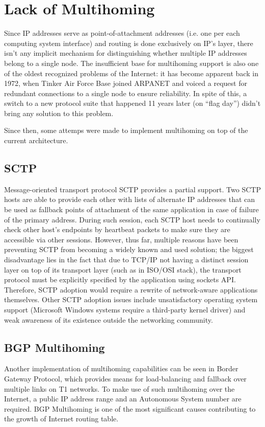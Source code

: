     \section{Lack of Multihoming}

        Since IP addresses serve as point-of-attachment addresses (i.e. one per each computing system interface) and routing is done exclusively on IP's layer, there isn't any implicit mechanism for distinguishing whether multiple IP addresses belong to a single node. The insufficient base for multihoming support is also one of the oldest recognized problems of the Internet: it has become apparent back in 1972, when Tinker Air Force Base joined ARPANET and voiced a request for redundant connections to a single node to ensure reliability. In spite of this, a switch to a new protocol suite that happened 11 years later (on ``flag day'') didn't bring any solution to this problem.

        Since then, some attemps were made to implement multihoming on top of the current architecture.

        \subsection{SCTP}
        Message-oriented transport protocol SCTP provides a partial support. Two SCTP hosts are able to provide each other with lists of alternate IP addresses that can be used as fallback points of attachment of the same application in case of failure of the primary address. During such session, each SCTP host needs to continually check other host's endpoints by heartbeat packets to make sure they are accessible via other sessions. However, thus far, multiple reasons have been preventing SCTP from becoming a widely known and used solution; the biggest disadvantage lies in the fact that due to TCP/IP not having a distinct session layer on top of its transport layer (such as in ISO/OSI stack), the transport protocol must be explicitly specified by the application using sockets API. Therefore, SCTP adoption would require a rewrite of network-aware applications themselves. Other SCTP adoption issues include unsatisfactory operating system support (Microsoft Windows systems require a third-party kernel driver) and weak awareness of its existence outside the networking community.

        \subsection{BGP Multihoming}
        Another implementation of multihoming capabilities can be seen in Border Gateway Protocol, which provides means for load-balancing and fallback over multiple links on T1 networks. To make use of such multihoming over the Internet, a public IP address range and an Autonomous System number are required. BGP Multihoming is one of the most significant causes contributing to the growth of Internet routing table.


